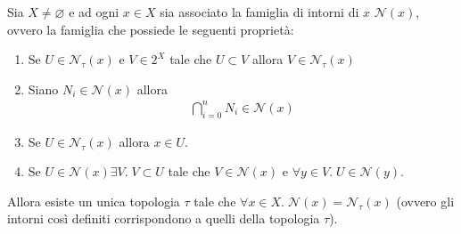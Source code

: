 \begin{proposition}
	Sia $X \neq \varnothing$ e ad ogni $x \in X$ sia associato la famiglia di intorni di $x$ $\mathcal{N}(x)$, ovvero la famiglia che possiede le seguenti proprietà:
	\begin{enumerate}
	\item Se $U \in \mathcal{N}_\tau(x)$ e $V \in 2^X$ tale che $U \subset V$ allora $V \in \mathcal{N}_\tau(x)$
	\item Siano $N_i \in \mathcal{N}(x)$ allora 
	\begin{equation}
	\begin{aligned}
	\bigcap^{n}_{i=0} N_i \in \mathcal{N}(x)
	\end{aligned}
	\end{equation}
	\item Se $U \in \mathcal{N}_\tau(x)$ allora $x \in U$. 
	\item Se $U \in \mathcal{N}(x) \exists V . \; V \subset U$ tale che $V \in \mathcal{N}(x)$ e $\forall y \in V. \; U \in \mathcal{N}(y)$.
\end{enumerate}
Allora esiste un unica topologia $\tau$ tale che $\forall x \in X . \; \mathcal{N}(x) = \mathcal{N}_\tau(x)$ (ovvero gli intorni così definiti corrispondono a quelli della topologia $\tau$).
\end{proposition}
